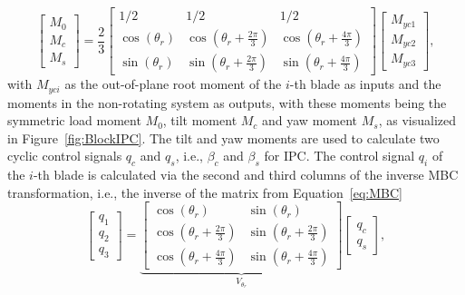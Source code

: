 \begin{equation} \label{eq:MBC}
    \left[ \begin{array}{c}
        M_0\\
        M_c\\
        M_s
    \end{array} \right] = \frac{2}{3}
    \left[ \begin{array}{ccc}
        1/2 & 1/2 & 1/2\\
        \cos(\theta_{r}) & \cos(\theta_{r} + \frac{2\pi}{3}) & \cos(\theta_{r} + \frac{4\pi}{3})\\
        \sin(\theta_{r}) & \sin(\theta_{r} + \frac{2\pi}{3}) & \sin(\theta_{r} + \frac{4\pi}{3})
    \end{array} \right]
    \left[ \begin{array}{c}
        M_{yc1}\\
        M_{yc2}\\
        M_{yc3}
    \end{array} \right], 
\end{equation}
with $M_{yci}$ as the out-of-plane root moment of the $i$-th blade as inputs and the moments in the non-rotating system as outputs, with these moments being the symmetric load moment $M_0$, tilt moment $M_c$ and yaw moment $M_s$, as visualized in Figure~\ref{fig:BlockIPC}. The tilt and yaw moments are used to calculate two cyclic control signals $q_c$ and $q_s$, i.e., $\beta_c$ and $\beta_s$ for IPC. 
The control signal $q_i$ of the $i$-th blade is calculated via the second and third columns of the inverse MBC transformation, i.e., the inverse of the matrix from Equation~\eqref{eq:MBC} %
\begin{equation} \label{eq:inverseMBC}
    \left[ \begin{array}{c}
        q_1\\
        q_2\\
        q_3
    \end{array} \right] = 
    \underbrace{\left[ \begin{array}{ccc}
            \cos(\theta_{r}) &  \sin(\theta_{r})\\
            \cos(\theta_{r} + \frac{2\pi}{3}) &  \sin(\theta_{r} + \frac{2\pi}{3})\\
            \cos(\theta_{r} + \frac{4\pi}{3}) &  \sin(\theta_{r} + \frac{4\pi}{3})
        \end{array} \right]}_{V_{\theta_{r}}}
    \left[ \begin{array}{c}
        q_c\\
        q_s
    \end{array} \right],
\end{equation}
